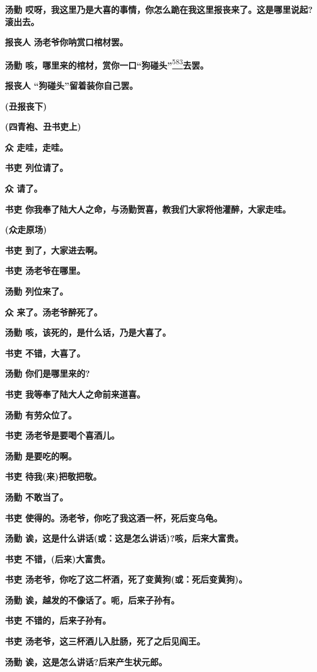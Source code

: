 \textbf{汤勤
哎呀，我这里乃是大喜的事情，你怎么跪在我这里报丧来了。这是哪里说起?滚出去。}

\textbf{报丧人 汤老爷你呐赏口棺材罢。}

\textbf{汤勤
咳，哪里来的棺材，赏你一口``狗碰头''}\protect\hyperlink{fn583}{\textsuperscript{583}}\textbf{去罢。}

\textbf{报丧人 ``狗碰头''留着装你自己罢。}

\textbf{(丑报丧下)}

\textbf{(四青袍、丑书吏上)}

\textbf{众 走哇，走哇。}

\textbf{书吏 列位请了。}

\textbf{众 请了。}

\textbf{书吏
你我奉了陆大人之命，与汤勤贺喜，教我们大家将他灌醉，大家走哇。}

\textbf{(众走原场)}

\textbf{书吏 到了，大家进去啊。}

\textbf{书吏 汤老爷在哪里。}

\textbf{汤勤 列位来了。}

\textbf{众 来了。汤老爷醉死了。}

\textbf{汤勤 咳，该死的，是什么话，乃是大喜了。}

\textbf{书吏 不错，大喜了。}

\textbf{汤勤 你们是哪里来的?}

\textbf{书吏 我等奉了陆大人之命前来道喜。}

\textbf{汤勤 有劳众位了。}

\textbf{书吏 汤老爷是要喝个喜酒儿。}

\textbf{汤勤 是要吃的啊。}

\textbf{书吏 待我(来)把敬把敬。}

\textbf{汤勤 不敢当了。}

\textbf{书吏 使得的。汤老爷，你吃了我这酒一杯，死后变乌龟。}

\textbf{汤勤 诶，这是什么讲话(或：这是怎么讲话)?咳，后来大富贵。}

\textbf{书吏 不错，(后来)大富贵。}

\textbf{书吏 汤老爷，你吃了这二杯酒，死了变黄狗(或：死后变黄狗)。}

\textbf{汤勤 诶，越发的不像话了。呃，后来子孙有。}

\textbf{书吏 不错的，后来子孙有。}

\textbf{书吏 汤老爷，这三杯酒儿入肚肠，死了之后见阎王。}

\textbf{汤勤 诶，这是怎么讲话?后来产生状元郎。}

